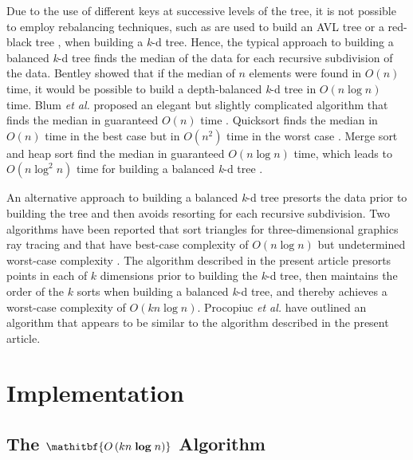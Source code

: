 \documentclass{sig-alternate}
\begin{document}
Due to the use of different keys at successive levels of the tree, it is not possible to employ rebalancing techniques, such as are used to build an AVL tree \cite{Adelson} or a red-black tree \cite{Bayer,Guibas}, when building a \emph{k}-d tree.  Hence, the typical approach to building a balanced \emph{k}-d tree finds the median of the data for each recursive subdivision of the data.  Bentley showed that if the median of $n$ elements were found in $O\left(n\right)$ time, it would be possible to build a depth-balanced \emph{k}-d tree in $O\left(n \log n\right)$ time.  Blum \emph{et al.} proposed an elegant but slightly complicated algorithm that finds the median in guaranteed $O\left(n\right)$ time \cite{Blum}.  Quicksort \cite{Hoare} finds the median in $O\left(n\right)$ time in the best case but in $O\left(n^2\right)$ time in the worst case \cite{Wirth}. Merge sort \cite{Neumann} and heap sort \cite{Williams} find the median in guaranteed $O\left(n \log n\right)$ time, which leads to $O\left(n \log^2 n\right)$ time for building a balanced \emph{k}-d tree \cite{Wald}.

An alternative approach to building a balanced \emph{k}-d tree presorts the data prior to building the tree and then avoids resorting for each recursive subdivision.  Two algorithms have been reported that sort triangles for three-dimensional graphics ray tracing and that have best-case complexity of $O\left(n \log n\right)$ but undetermined worst-case complexity \cite{Havran,Wald}.  The algorithm described in the present article presorts points in each of $k$ dimensions prior to building the \emph{k}-d tree, then maintains the order of the $k$ sorts when building a balanced \emph{k}-d tree, and thereby achieves a worst-case complexity of $O\left(kn \log n\right)$.  Procopiuc \emph{et al.} have outlined an algorithm \cite{Procopiuc} that appears to be similar to the algorithm described in the present article.


\section{Implementation}
\subsection{The $\mathitbf{O\left(kn \; \boldsymbol{\log} \; n\right)}$ Algorithm}
\label{sec:knlogn_algorithm}
\end{document}
